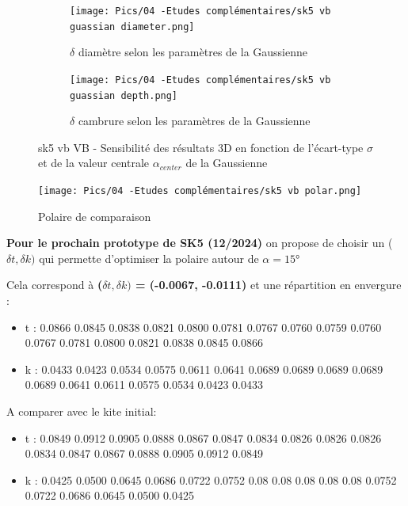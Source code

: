 \begin{figure}[H]
    \centering
    \begin{subfigure}[b]{0.45\textwidth}
        \centering
        \texttt{[image: Pics/04 -Etudes complémentaires/sk5 vb guassian diameter.png]}
        \caption{$\delta$ diamètre selon les paramètres de la Gaussienne}
        \label{fig:diametre gaussien sk5 vb}
    \end{subfigure}
    \hfill
    \begin{subfigure}[b]{0.45\textwidth}
        \centering
        \texttt{[image: Pics/04 -Etudes complémentaires/sk5 vb guassian depth.png]}
        \caption{$\delta$ cambrure selon les paramètres de la Gaussienne}
        \label{fig:cambrure gaussien sk5 vb}
    \end{subfigure}
    \caption{sk5 vb VB - Sensibilité des résultats 3D en fonction de l'écart-type $\sigma$ et de la valeur centrale $\alpha_{center}$ de la Gaussienne}
    \label{fig:gaussian sensibility sk5 vb}
\end{figure}

\begin{figure}[H]
    \centering
    \texttt{[image: Pics/04 -Etudes complémentaires/sk5 vb polar.png]}
    \caption{Polaire de comparaison}
    \label{fig:polar sk5 vb}
\end{figure}

\textbf{Pour le prochain prototype de SK5 (12/2024)} on propose de choisir un ($\delta t, \delta k)$ qui permette d'optimiser la polaire autour de $\alpha = 15$°

Cela correspond à \textbf{($\delta t, \delta k)$ = (-0.0067, -0.0111)} et une répartition en envergure :
\begin{itemize}
    \item t : 0.0866 0.0845 0.0838 0.0821 0.0800 0.0781 0.0767  0.0760  0.0759 0.0760  0.0767  0.0781 0.0800 0.0821 0.0838 0.0845 0.0866
    \item k : 0.0433 0.0423 0.0534 0.0575 0.0611 0.0641 0.0689 0.0689 0.0689 0.0689 0.0689 0.0641 0.0611 0.0575 0.0534 0.0423 0.0433
\end{itemize}

A comparer avec le kite initial:
\begin{itemize}
    \item t : 0.0849 0.0912 0.0905 0.0888 0.0867 0.0847
    0.0834 0.0826 0.0826 0.0826 0.0834 0.0847
    0.0867 0.0888 0.0905 0.0912 0.0849
    \item k : 0.0425 0.0500 0.0645 0.0686 0.0722 0.0752 0.08 0.08 0.08 0.08 0.08 0.0752 0.0722 0.0686 0.0645 0.0500 0.0425
\end{itemize}

